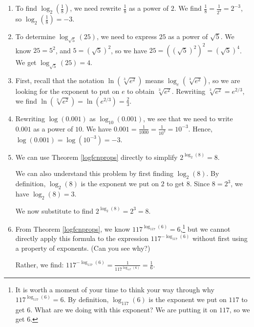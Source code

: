 \documentclass{ximera}
\begin{document}
\begin{example}
\begin{explanation}
\begin{enumerate}
\begin{enumerate}
\item To find $\log_{2}\left(\frac{1}{8}\right)$, we need rewrite $\frac{1}{8}$ as a power of $2$.  We find $\frac{1}{8} = \frac{1}{2^{3}} = 2^{-3}$, so $\log_{2}\left(\frac{1}{8}\right) = -3$.

\item To determine $\log_{\sqrt{5}}(25)$, we need to express $25$ as a power of $\sqrt{5}$.  We know $25 = 5^2$, and $5 = \left(\sqrt{5}\right)^2$, so we have $25 = \left(\left(\sqrt{5}\right)^2\right)^2 = \left(\sqrt{5}\right)^4$.  We get $\log_{\sqrt{5}}(25) = 4$.

\item  First, recall that the notation  $\ln\left(\sqrt[3]{e^2}\right)$ means $\log_{e}\left(\sqrt[3]{e^2}\right)$, so we are looking for the exponent to put on $e$ to obtain $\sqrt[3]{e^2}$.  Rewriting $\sqrt[3]{e^2} = e^{2/3}$, we find  $\ln\left(\sqrt[3]{e^2}\right) =  \ln\left(e^{2/3}\right) = \frac{2}{3}$.

\item  Rewriting $\log(0.001)$ as $\log_{10} (0.001)$, we see that we need to write $0.001$ as a power of $10$.  We have $0.001 = \frac{1}{1000} = \frac{1}{10^3} = 10^{-3}$.  Hence, $\log(0.001) = \log\left(10^{-3}\right) = -3$.

\item  We can use Theorem \ref{logfcnprops} directly to simplify  $2^{\log_{2}(8)} = 8$. 

 

We can also understand this problem by first finding $\log_{2}(8)$.  By definition, $\log_{2}(8)$ is the exponent we put on $2$ to get $8$.  Since $8 = 2^3$, we have $\log_{2}(8) = 3$.  


We now substitute to find $2^{\log_{2}(8)} = 2^3 = 8$.

\item  From Theorem \ref{logfcnprops}, we know $117^{\log_{117}(6)}=6$,\footnote{It is worth a moment of your time to think your way through why $117^{\log_{117}(6)}=6$.  By definition, $\log_{117}(6)$ is the exponent we put on $117$ to get $6$.  What are we doing with this exponent?  We are putting it on $117$, so we get $6$.} but we cannot directly apply this formula to the expression $117^{-\log_{117}(6)}$ without first using a property of exponents. (Can you see why?)

 

Rather, we find: $117^{-\log_{117}(6)} = \frac{1}{117^{\log_{117}(6)}}  = \frac{1}{6}$. 
 
\end{enumerate}


\end{enumerate}
\end{explanation}
\end{example}
\end{document}
